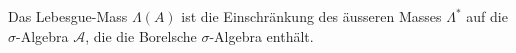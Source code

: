 \begin{definition}
    Das Lebesgue-Mass $\Lambda(A)$ ist die Einschränkung des äusseren Masses $\Lambda^*$ auf die $\sigma$-Algebra $\mathcal{A}$, die die Borelsche $\sigma$-Algebra enthält.
\end{definition}